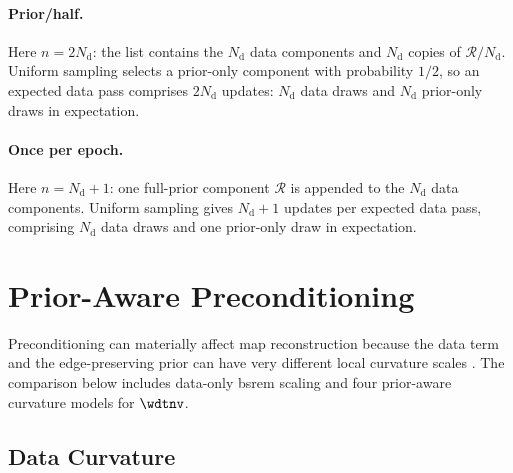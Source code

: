 \paragraph{Prior/half.}
Here $n=2N_{\mathrm d}$: the list contains the $N_{\mathrm d}$ data components and $N_{\mathrm d}$ copies of $\mathcal R/N_{\mathrm d}$. Uniform sampling selects a prior-only component with probability $1/2$, so an expected data pass comprises $2N_{\mathrm d}$ updates: $N_{\mathrm d}$ data draws and $N_{\mathrm d}$ prior-only draws in expectation.

\paragraph{Once per epoch.}
Here $n=N_{\mathrm d}+1$: one full-prior component $\mathcal R$ is appended to the $N_{\mathrm d}$ data components. Uniform sampling gives $N_{\mathrm d}+1$ updates per expected data pass, comprising $N_{\mathrm d}$ data draws and one prior-only draw in expectation.

\section{Prior-Aware Preconditioning}
\label{sec:optimisation_preconditioners}
\label{subsec:preconditioning}

Preconditioning can materially affect \gls{map} reconstruction because the data term and the edge-preserving prior can have very different local curvature scales \cite{clinthornePreconditioningMethodsImproved1993,ahn_globally_2003,depierroFastEMlikeMethods2001,ehrhardtFastPETReconstruction2025a}. The comparison below includes data-only \gls{bsrem} scaling and four prior-aware curvature models for $\wdtnv$.

\subsection{Data Curvature}
\label{subsec:optimisation_data_preconditioning}

